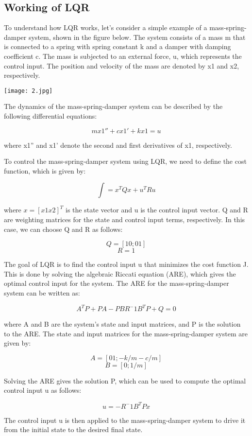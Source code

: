 \documentclass[12pt]{article}
\begin{document}
\subsection{Working of LQR}
To understand how LQR works, let's consider a simple example of a mass-spring-damper system, shown in the figure below. The system consists of a mass m that is connected to a spring with spring constant k and a damper with damping coefficient c. The mass is subjected to an external force, u, which represents the control input. The position and velocity of the mass are denoted by x1 and x2, respectively.



\texttt{[image: 2.jpg]}



The dynamics of the mass-spring-damper system can be described by the following differential equations:

$$mx1'' + cx1' + kx1 = u$$

where x1'' and x1' denote the second and first derivatives of x1, respectively.

To control the mass-spring-damper system using LQR, we need to define the cost function, which is given by:

$$\int = x^TQx + u^TRu$$

where $x = [x1 x2]^T$ is the state vector and u is the control input vector. Q and R are weighting matrices for the state and control input terms, respectively. In this case, we can choose Q and R as follows:

$$Q = [1 0; 0 1]$$
$$R = 1$$

The goal of LQR is to find the control input u that minimizes the cost function J. This is done by solving the algebraic Riccati equation (ARE), which gives the optimal control input for the system. The ARE for the mass-spring-damper system can be written as:

$$A^T P + PA - PBR^-1B^TP + Q = 0$$

where A and B are the system's state and input matrices, and P is the solution to the ARE. The state and input matrices for the mass-spring-damper system are given by:

$$A = [0 1; -k/m -c/m]$$
$$B = [0; 1/m]$$

Solving the ARE gives the solution P, which can be used to compute the optimal control input u as follows:

$$u = -R^-1B^TPx$$

The control input u is then applied to the mass-spring-damper system to drive it from the initial state to the desired final state.
\end{document}

